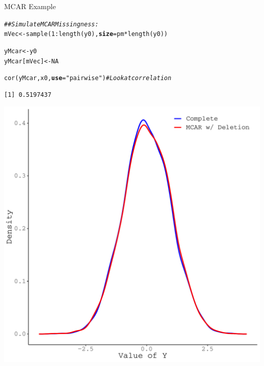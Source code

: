 \documentclass{beamer}\usepackage[]{graphicx}\usepackage[]{color}
\makeatletter
\newcommand{\hlnum}[1]{\textcolor[rgb]{0.69,0.494,0}{#1}}%
\newcommand{\hlstr}[1]{\textcolor[rgb]{0.749,0.012,0.012}{#1}}%
\newcommand{\hlcom}[1]{\textcolor[rgb]{0.514,0.506,0.514}{\textit{#1}}}%
\newcommand{\hlopt}[1]{\textcolor[rgb]{0,0,0}{#1}}%
\newcommand{\hlstd}[1]{\textcolor[rgb]{0,0,0}{#1}}%
\newcommand{\hlkwb}[1]{\textcolor[rgb]{0,0.341,0.682}{#1}}%
\newcommand{\hlkwc}[1]{\textcolor[rgb]{0,0,0}{\textbf{#1}}}%
\newcommand{\hlkwd}[1]{\textcolor[rgb]{0.004,0.004,0.506}{#1}}%
\newenvironment{kframe}{%
 \def\at@end@of@kframe{}%
 \ifinner\ifhmode%
  \def\at@end@of@kframe{\end{minipage}}%
  \begin{minipage}{\columnwidth}%
 \fi\fi%
 \def\FrameCommand##1{\hskip\@totalleftmargin \hskip-\fboxsep
 \colorbox{shadecolor}{##1}\hskip-\fboxsep
     \hskip-\linewidth \hskip-\@totalleftmargin \hskip\columnwidth}%
 \MakeFramed {\advance\hsize-\width
   \@totalleftmargin\z@ \linewidth\hsize
   \@setminipage}}%
 {\par\unskip\endMakeFramed%
 \at@end@of@kframe}
\newenvironment{knitrout}{}{} %
\makeatother
\begin{document}
\begin{frame}{MCAR Example}

\begin{knitrout}\footnotesize
{}\color{fgcolor}\begin{kframe}
\begin{alltt}
\hlcom{## Simulate MCAR Missingness:}
\hlstd{mVec} \hlkwb{<-} \hlkwd{sample}\hlstd{(}\hlnum{1} \hlopt{:} \hlkwd{length}\hlstd{(y0),} \hlkwc{size} \hlstd{= pm} \hlopt{*} \hlkwd{length}\hlstd{(y0))}

\hlstd{yMcar}       \hlkwb{<-} \hlstd{y0}
\hlstd{yMcar[mVec]} \hlkwb{<-} \hlnum{NA}

\hlkwd{cor}\hlstd{(yMcar, x0,} \hlkwc{use} \hlstd{=} \hlstr{"pairwise"}\hlstd{)} \hlcom{# Look at correlation}
\end{alltt}
\begin{verbatim}
[1] 0.5197437
\end{verbatim}
\end{kframe}
\end{knitrout}

\pagebreak

\begin{knitrout}\footnotesize
{}\color{fgcolor}

{\centering \includegraphics[width=0.65\linewidth]{figure/intro-unnamed-chunk-12-1} 

}


\end{knitrout}

\end{frame}

\end{document}
